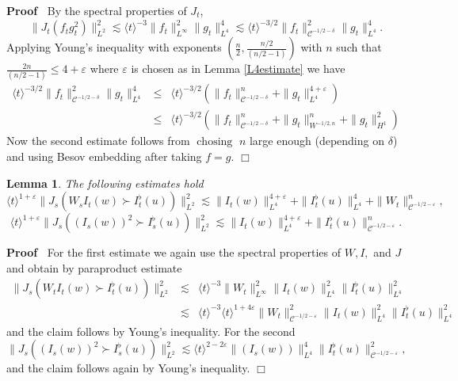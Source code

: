 \documentclass[11pt]{article}
\newcommand{\tmop}[1]{\ensuremath{\operatorname{#1}}}
\newenvironment{proof}{\noindent\textbf{Proof\ }}{\hspace*{\fill}$\Box$\medskip}
\newtheorem{lemma}{Lemma}
\newcommand{\VV}{\mathscr{C}}
\begin{document}
\begin{proof}
  By the spectral properties of $J_t$,
  \[ \| J_t (f_t g_t^2) \|^2_{L^2} \lesssim \langle t \rangle^{- 3} \| f_t
     \|^2_{L^{\infty}} \| g_t \|^4_{L^4} \lesssim \langle t \rangle^{- 3 / 2}
     \| f_t \|^2_{\VV^{- 1 / 2 - \delta}} \| g_t \|_{L^4}^4 . \]
  Applying Young's inequality with exponents $\left( \frac{n}{2}, \frac{n /
  2}{(n / 2 - 1)} \right)$ with $n$ such that $\frac{2 n}{(n / 2 - 1)}
  \leqslant 4 + \varepsilon$ where $\varepsilon$ is chosen as in Lemma
  \ref{L4estimate} we have
  \begin{eqnarray*}
    \langle t \rangle^{- 3 / 2} \| f_t \|^2_{\VV^{- 1 / 2 - \delta}} \| g_t
    \|_{L^4}^4 & \leqslant & \langle t \rangle^{- 3 / 2} \left( \| f_t
    \|^n_{\VV^{- 1 / 2 - \delta}} + \| g_t \|_{L^4}^{4 + \varepsilon}
    \right)\\
    & \leqslant & \langle t \rangle^{- 3 / 2} \left( \| f_t \|^n_{\VV^{- 1 /
    2 - \delta}} + \| g_t \|_{W^{- 1 / 2, n}}^n + \| g_t \|^2_{H^1} \right)
  \end{eqnarray*}
  Now the second estimate follows from $\tmop{chosing}$ $n$ large enough
  (depending on $\delta$) and using Besov embedding after taking $f = g$.
\end{proof}

\begin{lemma}
  The following estimates hold\label{analyticestimate3}
  \[ \langle t \rangle^{1 + \varepsilon} \| J_s (W_s I_t (w) \succ
     I^{\flat}_t (u)) \|^2_{L^2} \lesssim \| I_t (w) \|^{4 +
     \varepsilon}_{L^4} + \| I^{\flat}_t (u) \|^4_{L^4} + \| W_t \|^n_{\VV^{-
     1 / 2 - \varepsilon}}, \]
  \[ \langle t \rangle^{1 + \varepsilon} \| J_s ((I_s (w))^2 \succ I^{\flat}_s
     (u)) \|^2_{L^2} \lesssim \| I_t (w) \|^{4 + \varepsilon}_{L^4} + \|
     I^{\flat}_t (u) \|^n_{\VV^{- 1 / 2 - \varepsilon}} . \]
\end{lemma}

\begin{proof}
  For the first estimate we again use the spectral properties of $W, I,$ and
  $J$ and obtain by paraproduct estimate
  \begin{eqnarray*}
    \| J_s (W_t I_t (w) \succ I^{\flat}_t (u)) \|^2_{L^2} & \lesssim &
    \langle t \rangle^{- 3} \| W_t \|^2_{L^{\infty}} \| I_t (w) \|_{L^4}^2 \|
    I^{\flat}_t (u) \|^2_{L^4}\\
    & \lesssim & \langle t \rangle^{- 3} \langle t \rangle^{1 + 4
    \varepsilon} \| W_t \|^2_{\VV^{- 1 / 2 - \varepsilon}} \| I_t (w)
    \|_{L^4}^2 \| I^{\flat}_t (u) \|^2_{L^4}
  \end{eqnarray*}
  and the claim follows by Young's inequality. For the second
  \[ \| J_s ((I_s (w))^2 \succ I^{\flat}_s (u)) \|^2_{L^2} \lesssim \langle t
     \rangle^{2 - 2 \varepsilon} \| (I_s (w)) \|_{L^4}^4 \| I^{\flat}_t (u)
     \|^2_{\VV^{- 1 / 2 - \varepsilon}}, \]
  and the claim follows again by Young's inequality. 
\end{proof}
\end{document}
